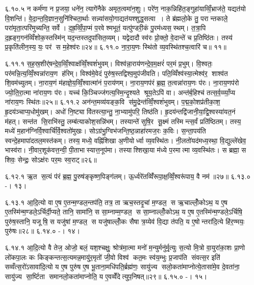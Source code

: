 ६.१०.५
न कर्म॑णा न प्र॒जया॒ धने॑न॒ त्यागे॑नैके अमृत॒त्वमा॑न॒शुः। परे॑ण॒ नाक॒न्निहि॑त॒ङ्गुहा॑याव्विँ॒भ्राज॑ते॒ यद्यत॑यो वि॒शन्ति॑। वे॒दा॒न्त॒वि॒ज्ञान॒सुनि॑श्चिता॒र्थाः सन्न्या॑सयो॒गाद्यत॑यश्शुद्ध॒सत्वा। ते ब्र॑ह्मलो॒के तु॒ परान्तकाले॒ परा॑मृता॒त्परि॑मुच्यन्ति॒ सर्वे। द॒ह्र॒व्विँ॒पा॒प्मं प॒रवेश्मभूतं॒ यत्पु॑ण्डरी॒कं पु॒रम॑ध्यस॒स्थम्। त॒त्रा॒पि द॒ह्रङ्ग॒गन॑व्विँशोक॒स्तस्मि॑न् यद॒न्तस्तदुपा॑सित॒व्यम्। यद्वेदादौ स्व॑रः प्रो॒क्तो॒ वे॒दान्ते॑ च प्र॒तिष्ठि॑तः। तस्य॑ प्र॒कृति॑लीन॒स्य॒ यः॒ पर॑ स म॒हेश्व॑रः॥२४॥
६.११.०
ना॒रा॒य॒णः स्थि॑तो व्य॒वस्थि॑तश्च॒त्वारि॑ च॥ ११॥
\anuvakamend

६.११.१
स॒ह॒स्र॒शीर्॑षन्दे॒व॒व्विँ॒श्वाक्ष॑व्विँ॒श्वशं॑भुवम्। विश्व॑न्ना॒राय॑णन्दे॒व॒म॒क्षरं॑ पर॒मं प्र॒भुम्। वि॒श्वतः॒ पर॑मन्नि॒त्य॒व्विँ॒श्वन्ना॑राय॒ण ह॑रिम्। विश्व॑मे॒वेदं पुरु॑ष॒स्तद्विश्व॒मुप॑जीवति। पति॒व्विँश्व॑स्या॒त्मेश्व॑र॒ शाश्व॑त शि॒वम॑च्युतम्। ना॒राय॒णं म॑हाज्ञे॒य॒व्विँ॒श्वात्मा॑नं प॒राय॑णम्। ना॒राय॒णप॑रं ब्र॒ह्म॒ त॒त्वन्ना॑राय॒णः प॑रः। ना॒राय॒णप॑रो ज्यो॒ति॒रा॒त्मा ना॑राय॒णः प॑रः। यच्च॑ कि॒ञ्चिज्ज॑गत्य॒स्मि॒न्दृ॒श्यते श्रूय॒तेऽपि॑ वा। अन्त॑र्ब॒हिश्च॑ तत्स॒र्व॒व्व्याँ॒प्य ना॑राय॒णः स्थि॑तः॥२५॥
६.११.२
अन॑न्त॒मव्य॑यङ्क॒वि स॑मु॒द्रेन्त॑व्विँ॒श्वशं॑भुवम्। प॒द्म॒को॒शप्र॑तीका॒श॒ हृ॒दय॑ञ्चाप्य॒धोमु॑खम्। अधो॑ नि॒ष्ट्या वि॑तस्त्या॒न्तु॒ ना॒भ्यामु॑परि॒ तिष्ठ॑ति। हृ॒दय॑न्तद्वि॑जानी॒या॒द्वि॒श्वस्या॑यत॒नं म॑हत्। सन्त॑त सि॒राभि॑स्तु॒ लम्ब॑त्याकोश॒सन्नि॑भम्। तस्यान्ते॑ सुषि॒र सू॒क्ष्मं तस्मिन्त्स॒र्वं प्रति॑ष्ठितम्। तस्य॒ मध्ये॑ म॒हान॑ग्निर्वि॒श्वार्चि॑र्वि॒श्वतो॑मुखः। सोऽग्र॑भु॒ग्विभ॑जन्ति॒ष्ठ॒न्नाहा॑रमज॒रः क॒विः। स॒न्ता॒पय॑ति स्वन्दे॒हमापा॑दतल॒मस्त॑कम्। तस्य॒ मध्ये॒ वह्नि॑शिखा अ॒णीयोर्ध्वा व्य॒वस्थि॑तः। नी॒लतो॑यद॑मध्य॒स्था॒ वि॒द्युल्ले॑खेव॒ भास्व॑रा। नी॒वार॒शूक॑वत्त॒न्वी॒ पी॒ताभास्यात्त॒नूप॑मा। तस्याश्शिखा॒या म॑ध्ये प॒रमात्मा व्य॒वस्थि॑तः। स ब्रह्मा॒ स शिवः॒ सेन्द्रः॒ सोऽक्ष॑रः पर॒मः स्व॒राट्॥२६॥
\anuvakamend

६.१२.१
ऋ॒त स॒त्यं प॑रं ब्र॒ह्म॒ पु॒रुष॑ङ्कृष्ण॒पिङ्ग॑लम्। ऊ॒र्ध्वरे॑तव्विँ॑रूपा॒क्ष॒व्विँ॒श्वरू॑पाय॒ वै नम॑॥२७॥%
६.१३.०
-। १३।
\anuvakamend

६.१३.१
आ॒दि॒त्यो वा ए॒ष ए॒तन्म॒ण्डल॒न्तप॑ति॒ तत्र॒ ता ऋच॒स्तदृ॒चां म॒ण्डल॒ स ऋ॒चाल्लोँ॒कोऽथ॒ य ए॒ष ए॒तस्मि॑न्म॒ण्डले॒ऽर्चिर्दी॒प्यते॒ तानि॒ सामा॑नि॒ स सा॒म्नाम्म॒ण्डल॒ स सा॒म्नाल्लोँ॒कोऽथ॒ य ए॒ष ए॒तस्मि॑न्म॒ण्डले॒ऽर्चिषि॒ पुरु॑ष॒स्तानि॒ यजूषि॒ स यजु॑षां म॒ण्डल॒ स यजु॑षाल्लोँ॒कः सैषा त्र॒य्येव॑ वि॒द्या त॑पति॒ य ए॒षोन्तरा॑दि॒त्ये हि॑र॒ण्मयः॒ पुरु॑षः॥२८॥
६.१४.०
-। १४।
\anuvakamend

६.१४.१
आ॒दि॒त्यो वै तेज॒ ओजो॒ बलं॒ यश॒श्चक्षुः॒ श्रोत्र॑मा॒त्मा मनो॑ म॒न्युर्मनु॑र्मृ॒त्युः स॒त्यो मि॒त्रो वा॒युरा॑का॒शः प्रा॒णो लो॑कपा॒लः कः किङ्कन्तत्स॒त्यमन्न॒मायु॑र॒मृतो॑ जी॒वो विश्व॑ कत॒मः स्व॑य॒म्भुः प्र॒जाप॑ति संवत्स॒र इति॑ सव्वँत्स॒रो॑ऽसावा॑दि॒त्यो य ए॒ष पुरु॑ष ए॒ष भू॒ताना॒मधि॑पति॒र्ब्रह्म॑णः॒ सायु॑ज्य सलो॒कता॑माप्नोत्ये॒तासा॑मे॒व दे॒वता॑ना॒ सायु॑ज्य सा॒र्ष्टिता समानलो॒कता॑माप्नोति॒ य ए॒वव्वेँदेत्युप॒निषत्॥२९॥
६.१५.०
-। १५।
\anuvakamend

